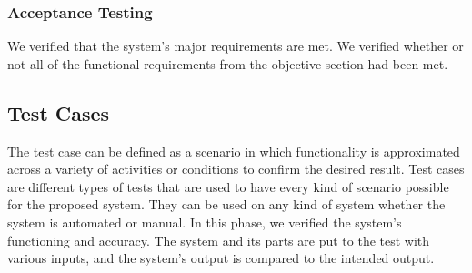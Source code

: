 \documentclass[12pt]{article}
\begin{document}
\noindent
\subsubsection{Acceptance Testing}
\vspace{0.5cm} %

\noindent
\normalsize We verified that the system's major requirements are met. We verified whether or not all of the functional requirements from the objective section had been met.

\vspace{1 cm}
\noindent
\subsection{Test Cases}

\vspace{0.5cm} %

\noindent
\normalsize The test case can be defined as a scenario in which functionality is approximated across a variety of activities or conditions to confirm the desired result. Test cases are different types of tests that are used to have every kind of scenario possible for the proposed system. They can be used on any kind of system whether the system is automated or manual. In this phase, we verified the system's functioning and accuracy. The system and its parts are put to the test with various inputs, and the system's output is compared to the intended output.
\newpage
\vspace{1 cm}

\noindent
\end{document}
